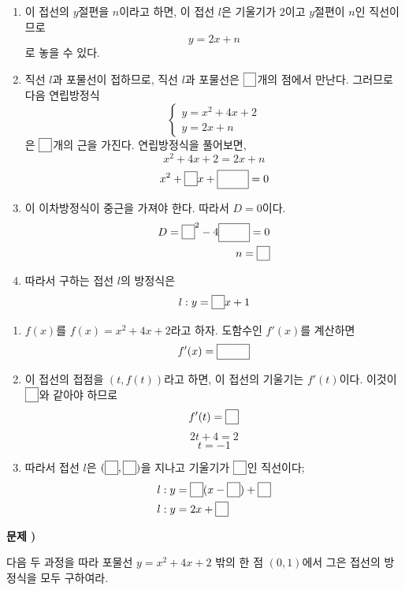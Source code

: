\documentclass[a4paper]{oblivoir}
\newcounter{num}
\newcommand\prob[1]
{\bigskip\par\noindent\stepcounter{num} \textbf{문제 \thenum) #1}\par\noindent}
\newcommand\pb[1]{\ensuremath{\fbox{\phantom{#1}}}}
\begin{document}
\noindent{}
\begin{enumerate}[(1)]
\item
이 접선의 \(y\)절편을 \(n\)이라고 하면, 이 접선 \(l\)은 기울기가 \(2\)이고 \(y\)절편이 \(n\)인 직선이므로
\[y=2x+n\]
로 놓을 수 있다.
\item
직선 \(l\)과 포물선이 접하므로, 직선 \(l\)과 포물선은 \pb{1}개의 점에서 만난다.
그러므로 다음 연립방정식
\[
\begin{cases}
y=x^2+4x+2\\
y=2x+n
\end{cases}
\]
은 \pb{1}개의 근을 가진다.
연립방정식을 풀어보면,
\[x^2+4x+2=2x+n\]
\[x^2+\pb2x+\pb{(2-n)}=0\]
\item
이 이차방정식이 중근을 가져야 한다.
따라서 \(D=0\)이다.
\begin{align*}
D=\pb2^2-4\pb{(2-n)}=0\\
n=\pb1
\end{align*}
\item
따라서 구하는 접선 \(l\)의 방정식은
\[l:y=\pb2x+1\]
\end{enumerate}

\noindent{}
\begin{enumerate}[(1)]
\item
\(f(x)\)를 \(f(x)=x^2+4x+2\)라고 하자.
도함수인 \(f'(x)\)를 계산하면
\[f'(x)=\pb{2x+4}\]
\item
이 접선의 접점을 \((t,f(t))\)라고 하면, 이 접선의 기울기는 \(f'(t)\)이다.
이것이 \(\pb{2}\)와 같아야 하므로
\[f'(t)=\pb2\]
\[2t+4=2\]
\[t=-1\]
\item
따라서 접선 \(l\)은 \((\pb1,\pb7)\)을 지나고 기울기가 \pb6인 직선이다;
\begin{align*}
l:y&=\pb6(x-\pb1)+\pb7\\
l:y&=2x+\pb1
\end{align*}
\end{enumerate}

%
\prob{}\label{type3}
다음 두 과정을 따라 포물선 \(y=x^2+4x+2\) 밖의 한 점 \((0,1)\)에서 그은 접선의 방정식을 모두 구하여라.
\end{document}

